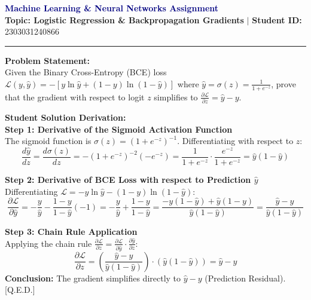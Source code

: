 \documentclass[11pt,a4paper]{article}
\begin{document}
\begin{center}
    {\large\bfseries\textcolor{navy}{Machine Learning \& Neural Networks Assignment}}\\[0.2cm]
    \textbf{Topic: Logistic Regression \& Backpropagation Gradients} \quad $\mid$ \quad \textbf{Student ID:} 2303031240866
\end{center}
\hrule
\vspace{0.4cm}

\noindent\textbf{Problem Statement:}\\
Given the Binary Cross-Entropy (BCE) loss $\mathcal{L}(y, \hat{y}) = -\left[y \ln \hat{y} + (1-y)\ln(1-\hat{y})\right]$ where $\hat{y} = \sigma(z) = \frac{1}{1 + e^{-z}}$, prove that the gradient with respect to logit $z$ simplifies to $\frac{\partial \mathcal{L}}{\partial z} = \hat{y} - y$.

\vspace{0.3cm}
\noindent\textbf{Student Solution Derivation:}\\
\textbf{Step 1: Derivative of the Sigmoid Activation Function}\\
The sigmoid function is $\sigma(z) = (1 + e^{-z})^{-1}$. Differentiating with respect to $z$:
\[
\frac{d\hat{y}}{dz} = \frac{d\sigma(z)}{dz} = -(1 + e^{-z})^{-2} (-e^{-z}) = \frac{1}{1 + e^{-z}} \cdot \frac{e^{-z}}{1 + e^{-z}} = \hat{y}(1 - \hat{y})
\]

\vspace{0.2cm}
\noindent\textbf{Step 2: Derivative of BCE Loss with respect to Prediction $\hat{y}$}\\
Differentiating $\mathcal{L} = -y \ln \hat{y} - (1-y)\ln(1-\hat{y})$:
\[
\frac{\partial \mathcal{L}}{\partial \hat{y}} = -\frac{y}{\hat{y}} - \frac{1-y}{1-\hat{y}}(-1) = -\frac{y}{\hat{y}} + \frac{1-y}{1-\hat{y}} = \frac{-y(1-\hat{y}) + \hat{y}(1-y)}{\hat{y}(1-\hat{y})} = \frac{\hat{y} - y}{\hat{y}(1-\hat{y})}
\]

\vspace{0.2cm}
\noindent\textbf{Step 3: Chain Rule Application}\\
Applying the chain rule $\frac{\partial \mathcal{L}}{\partial z} = \frac{\partial \mathcal{L}}{\partial \hat{y}} \cdot \frac{\partial \hat{y}}{\partial z}$:
\[
\frac{\partial \mathcal{L}}{\partial z} = \left(\frac{\hat{y} - y}{\hat{y}(1-\hat{y})}\right) \cdot \left(\hat{y}(1 - \hat{y})\right) = \hat{y} - y
\]
\textbf{Conclusion:} The gradient simplifies directly to $\hat{y} - y$ (Prediction Residual). [Q.E.D.]
\end{document}
